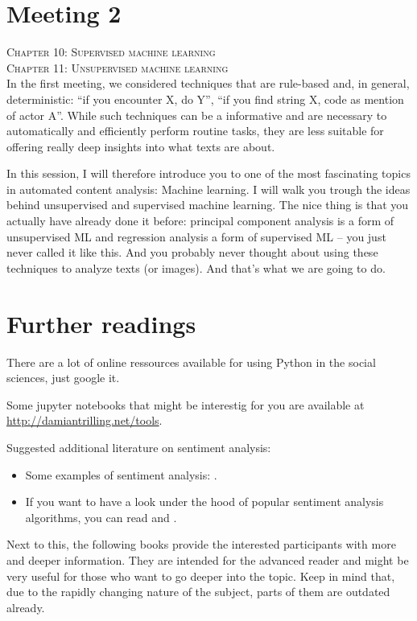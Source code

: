 \documentclass[a4paper,12pt]{report}
\begin{document}
\section*{Meeting 2}
\textsc{ Chapter 10: Supervised machine learning}\\
\textsc{ Chapter 11: Unsupervised machine learning}\\

In the first meeting, we considered techniques that are rule-based and, in general, deterministic: ``if you encounter X, do Y'', ``if you find string X, code as mention of actor A''. While such techniques can be a informative and are necessary to automatically and efficiently perform routine tasks, they are less suitable for offering really deep insights into what texts are about.

In this session, I will therefore introduce you to one of the most fascinating topics in automated content analysis: Machine learning. I will walk you trough the ideas behind unsupervised and supervised machine learning. The nice thing is that you actually have already done it before: principal component analysis is a form of unsupervised ML and regression analysis a form of supervised ML -- you just never called it like this. And you probably never thought about using these techniques to analyze texts (or images). And that's what we are going to do.




\section*{Further readings}

There are a lot of online ressources available for using Python in the social sciences, just google it. 

Some jupyter notebooks that might be interestig for you are available at \url{http://damiantrilling.net/tools}.

Suggested additional literature on sentiment analysis: 
\begin{itemize}
	\item Some  examples of sentiment analysis: \cite{Huang2007,Pestian2012,Mostafa2013}. 
	\item If you want to have a look under the hood of popular sentiment analysis algorithms, you can read \cite{Thelwall2012} and \cite{Hutto2014}.
\end{itemize}



Next to this, the following books provide the interested participants with more and deeper information. They are intended for the advanced reader and might be very useful for those who want to go deeper into the topic. Keep in mind that, due to the rapidly changing nature of the subject, parts of them are outdated already.
\end{document}
